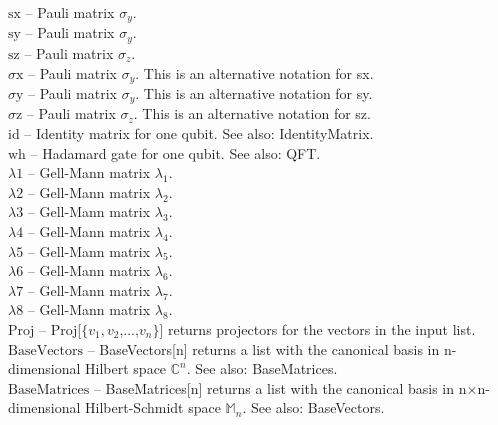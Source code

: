 \documentclass[a4paper,10pt]{scrartcl}
\begin{document}
\noindent\textbf{$ \text{sx} $ }-- Pauli matrix $ \sigma _y. $\\[8pt]
\noindent\textbf{$ \text{sy} $ }-- Pauli matrix $ \sigma _y. $\\[8pt]
\noindent\textbf{$ \text{sz} $ }-- Pauli matrix $ \sigma _z. $\\[8pt]
\noindent\textbf{$ \text{$\sigma $x} $ }-- Pauli matrix $ \sigma _y $. This is an alternative notation for sx.$  $\\[8pt]
\noindent\textbf{$ \text{$\sigma $y} $ }-- Pauli matrix $ \sigma _y $. This is an alternative notation for sy.$  $\\[8pt]
\noindent\textbf{$ \text{$\sigma $z} $ }-- Pauli matrix $ \sigma _z $. This is an alternative notation for sz.$  $\\[8pt]
\noindent\textbf{$ \text{id} $ }-- Identity matrix for one qubit. See also: IdentityMatrix.$  $\\[8pt]
\noindent\textbf{$ \text{wh} $ }-- Hadamard gate for one qubit. See also: QFT.$  $\\[8pt]
\noindent\textbf{$ \text{$\lambda $1} $ }-- Gell-Mann matrix $ \lambda _1. $\\[8pt]
\noindent\textbf{$ \text{$\lambda $2} $ }-- Gell-Mann matrix $ \lambda _2. $\\[8pt]
\noindent\textbf{$ \text{$\lambda $3} $ }-- Gell-Mann matrix $ \lambda _3. $\\[8pt]
\noindent\textbf{$ \text{$\lambda $4} $ }-- Gell-Mann matrix $ \lambda _4. $\\[8pt]
\noindent\textbf{$ \text{$\lambda $5} $ }-- Gell-Mann matrix $ \lambda _5. $\\[8pt]
\noindent\textbf{$ \text{$\lambda $6} $ }-- Gell-Mann matrix $ \lambda _6. $\\[8pt]
\noindent\textbf{$ \text{$\lambda $7} $ }-- Gell-Mann matrix $ \lambda _7. $\\[8pt]
\noindent\textbf{$ \text{$\lambda $8} $ }-- Gell-Mann matrix $ \lambda _8. $\\[8pt]
\noindent\textbf{$ \text{Proj} $ }-- Proj[$\{$$ v_1,v_2 $,...,$ v_n $$\}$] returns projectors for the vectors in the input list.$  $\\[8pt]
\noindent\textbf{$ \text{BaseVectors} $ }-- BaseVectors[n] returns a list with the canonical basis in n-dimensional Hilbert space $ \mathbb{C}^n $. See also: BaseMatrices.$  $\\[8pt]
\noindent\textbf{$ \text{BaseMatrices} $ }-- BaseMatrices[n] returns a list with the canonical basis in n$\times $n-dimensional Hilbert-Schmidt space $ \mathbb{M}_n $. See also: BaseVectors.$  $\\[8pt]
\end{document}
